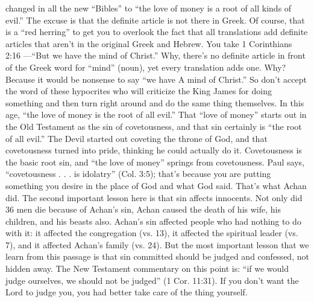 {changed in all the new “Bibles” to “the love of
money is a root of all kinds of evil.” The
excuse is that the definite article is not there in
Greek. Of course, that is a “red herring” to get
you to overlook the fact that all translations add
definite articles that aren’t in the original Greek
and Hebrew. You take 1 Corinthians 2:16
—“But we have the mind of Christ.” Why,
there’s no definite article in front of the Greek
word for “mind” (noun), yet every translation
adds one. Why? Because it would be nonsense
to say “we have A mind of Christ.” So don’t
accept the word of these hypocrites who will
criticize the King James for doing something
and then turn right around and do the same
thing themselves.
In this age, “the love of money is the root
of all evil.” That “love of money” starts out in
the Old Testament as the sin of covetousness,
and that sin certainly is “the root of all evil.”
The Devil started out coveting the throne of
God, and that covetousness turned into pride,
thinking he could actually do it. Covetousness is
the basic root sin, and “the love of money”
springs from covetousness. Paul says,
“covetousness . . . is idolatry” (Col. 3:5);
that’s because you are putting something you
desire in the place of God and what God said.
That’s what Achan did.
The second important lesson here is that sin
affects innocents. Not only did 36 men die
because of Achan’s sin, Achan caused the death
of his wife, his children, and his beasts also.
Achan’s sin affected people who had nothing to
do with it: it affected the congregation (vs. 13),
it affected the spiritual leader (vs. 7), and it
affected Achan’s family (vs. 24).
But the most important lesson that we learn
from this passage is that sin committed should
be judged and confessed, not hidden away. The
New Testament commentary on this point is:
“if we would judge ourselves, we should not
be judged” (1 Cor. 11:31). If you don’t want
the Lord to judge you, you had better take care
of the thing yourself.}
